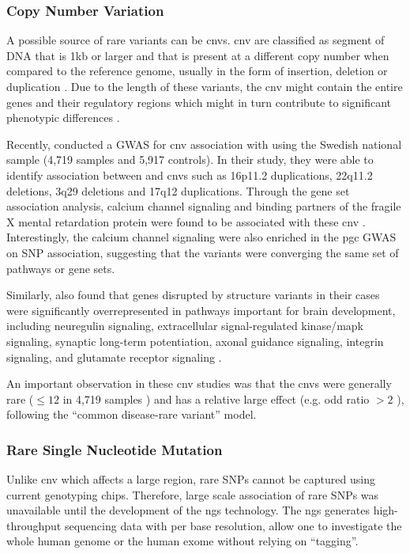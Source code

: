 	\subsubsection{Copy Number Variation}
	A possible source of rare variants can be \glspl{cnv}.
	\gls{cnv} are classified as segment of DNA that is 1\gls{kb} or larger and that is present at a different copy number when compared to the reference genome, usually in the form of insertion, deletion or duplication \citep{Feuk2006}.
	Due to the length of these variants, the \gls{cnv} might contain the entire genes and their regulatory regions which might in turn contribute to significant phenotypic differences \citep{Feuk2006}.
	
	Recently, \citet{Szatkiewicz2014} conducted a \gls{GWAS} for \gls{cnv} association with  using the Swedish national sample (4,719  samples and 5,917 controls).
	In their study, they were able to identify association between  and \glspl{cnv} such as 16p11.2 duplications, 22q11.2 deletions, 3q29 deletions and 17q12 duplications.
	Through the gene set association analysis, calcium channel signaling and binding partners of the fragile X mental retardation protein were found to be associated with these \gls{cnv} \citep{Szatkiewicz2014}.
	Interestingly, the calcium channel signaling were also enriched in the \gls{pgc} \gls{GWAS} on \gls{SNP} association, suggesting that the variants were converging the same set of pathways or gene sets. 
	
	Similarly, \citet{Walsh2008} also found that genes disrupted by structure variants in their cases were significantly overrepresented in pathways important for brain development, including neuregulin signaling, extracellular signal-regulated kinase/\gls{mapk} signaling, 
	synaptic long-term potentiation, axonal guidance signaling, integrin signaling, and glutamate receptor signaling \citep{Walsh2008}.
	
	An important observation in these \gls{cnv} studies was that the \glspl{cnv}  were generally rare ($\le12$ in 4,719 samples \citep{Szatkiewicz2014}) and has a relative large effect (e.g. odd ratio $>2$ \citep{Szatkiewicz2014,Walsh2008}), following the ``common disease-rare variant'' model.
	
	\subsubsection{Rare Single Nucleotide Mutation}
	Unlike \gls{cnv} which affects a large region, rare \glspl{SNP} cannot be captured using current genotyping chips.
	Therefore, large scale association of rare \glspl{SNP} was unavailable until the development of the \gls{ngs} technology.
	The \gls{ngs} generates high-throughput sequencing data with per base resolution, allow one to investigate the whole human genome or the human exome without relying on ``tagging''.
	
